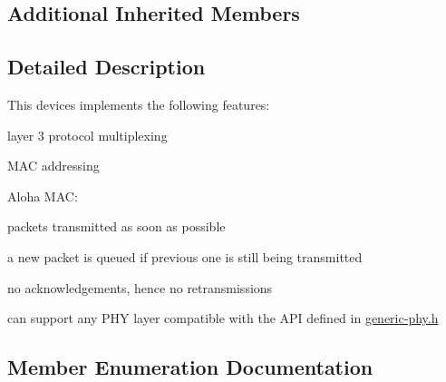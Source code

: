 \subsection*{Additional Inherited Members}


\subsection{Detailed Description}
This devices implements the following features\+:
\begin{DoxyItemize}
\item layer 3 protocol multiplexing
\item M\+AC addressing
\item Aloha M\+AC\+:
\begin{DoxyItemize}
\item packets transmitted as soon as possible
\item a new packet is queued if previous one is still being transmitted
\item no acknowledgements, hence no retransmissions
\end{DoxyItemize}
\item can support any P\+HY layer compatible with the A\+PI defined in \hyperlink{generic-phy_8h}{generic-\/phy.\+h} 
\end{DoxyItemize}

\subsection{Member Enumeration Documentation}
